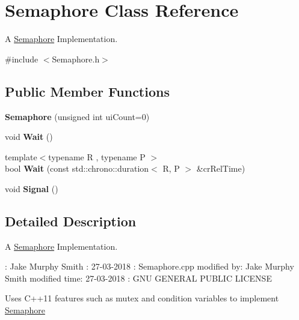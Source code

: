 \hypertarget{classSemaphore}{}\section{Semaphore Class Reference}
\label{classSemaphore}


A \hyperlink{classSemaphore}{Semaphore} Implementation.  




{\ttfamily \#include $<$Semaphore.\+h$>$}

\subsection*{Public Member Functions}
\begin{DoxyCompactItemize}
\item 
{\bfseries Semaphore} (unsigned int ui\+Count=0)\hypertarget{classSemaphore_a0d9290d316636875ca85d1d78950a817}{}\label{classSemaphore_a0d9290d316636875ca85d1d78950a817}

\item 
void {\bfseries Wait} ()\hypertarget{classSemaphore_a72aabebf026e3a8b1f3e4d0fa8ee1eda}{}\label{classSemaphore_a72aabebf026e3a8b1f3e4d0fa8ee1eda}

\item 
{\footnotesize template$<$typename R , typename P $>$ }\\bool {\bfseries Wait} (const std\+::chrono\+::duration$<$ R, P $>$ \&cr\+Rel\+Time)\hypertarget{classSemaphore_a7f700173ae86ae623684109066e07656}{}\label{classSemaphore_a7f700173ae86ae623684109066e07656}

\item 
void {\bfseries Signal} ()\hypertarget{classSemaphore_a86f92f738b4486439b296d8e235895f2}{}\label{classSemaphore_a86f92f738b4486439b296d8e235895f2}

\end{DoxyCompactItemize}


\subsection{Detailed Description}
A \hyperlink{classSemaphore}{Semaphore} Implementation. 

\+: Jake Murphy Smith \+: 27-\/03-\/2018 \+: Semaphore.\+cpp  modified by\+: Jake Murphy Smith  modified time\+: 27-\/03-\/2018 \+: G\+NU G\+E\+N\+E\+R\+AL P\+U\+B\+L\+IC L\+I\+C\+E\+N\+SE

Uses C++11 features such as mutex and condition variables to implement \hyperlink{classSemaphore}{Semaphore}

